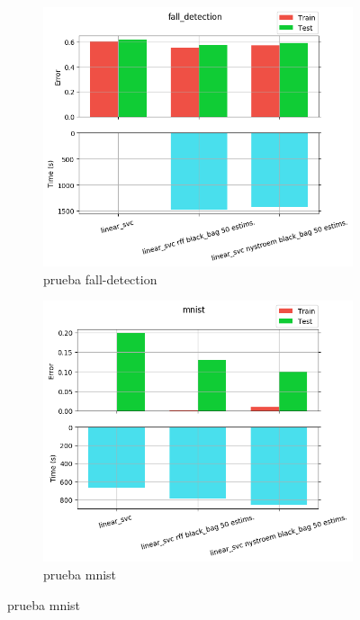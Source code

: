 \begin{figure}[ht]
  \centering
  \begin{subfigure}[b]{0.5\linewidth}
    \centering\includegraphics[width=\imgscale\linewidth]{Figures/2_6/fall_detection}
    \caption{prueba fall-detection}
    \label{fig:2_6_fall_detection}
  \end{subfigure}%
  \begin{subfigure}[b]{0.5\linewidth}
    \centering\includegraphics[width=\imgscale\linewidth]{Figures/2_6/mnist}
    \caption{prueba mnist}
    \label{fig:2_6_mnist}
  \end{subfigure}
\end{figure}


